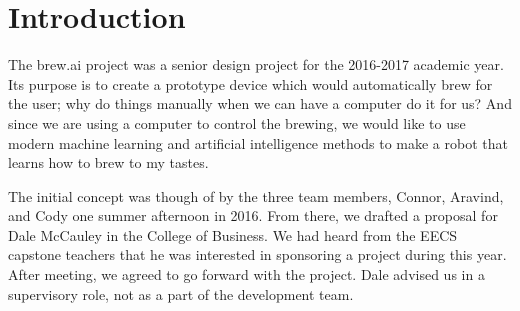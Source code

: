 \section{Introduction}
The brew.ai project was a senior design project for the 2016-2017 academic year. Its purpose is to create a prototype device which would automatically brew for the user; why do things manually when we can have a computer do it for us? And since we are using a computer to control the brewing, we would like to use modern machine learning and artificial intelligence methods to make a robot that learns how to brew to my tastes.

The initial concept was though of by the three team members, Connor, Aravind, and Cody one summer afternoon in 2016. From there, we drafted a proposal for Dale McCauley in the College of Business. We had heard from the EECS capstone teachers that he was interested in sponsoring a project during this year. After meeting, we agreed to go forward with the project. Dale advised us in a supervisory role, not as a part of the development team.
